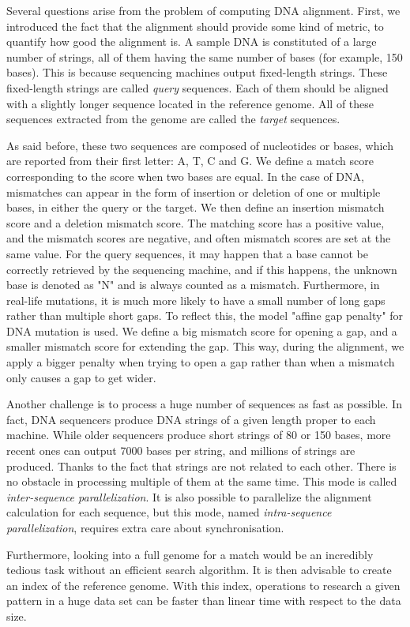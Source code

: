 Several questions arise from the problem of computing DNA alignment. First, we introduced the fact that the alignment should provide some kind of metric, to quantify how good the alignment is. A sample DNA is constituted of a large number of strings, all of them having the same number of bases (for example, 150 bases). This is because sequencing machines output fixed-length strings. These fixed-length strings are called \emph{query} sequences. Each of them should be aligned with a slightly longer sequence located in the reference genome. All of these sequences extracted from the genome are called the \emph{target} sequences.

As said before, these two sequences are composed of nucleotides or bases, which are reported from their first letter: A, T, C and G. We define a match score corresponding to the score when two bases are equal. In the case of DNA, mismatches can appear in the form of insertion or deletion of one or multiple bases, in either the query or the target. We then define an insertion mismatch score and a deletion mismatch score. The matching score has a positive value, and the mismatch scores are negative, and often mismatch scores are set at the same value. For the query sequences, it may happen that a base cannot be correctly retrieved by the sequencing machine, and if this happens, the unknown base is denoted as "N" and is always counted as a mismatch. Furthermore, in real-life mutations, it is much more likely to have a small number of long gaps rather than multiple short gaps. To reflect this, the model "affine gap penalty" for DNA mutation is used. We define a big mismatch score for opening a gap, and a smaller mismatch score for extending the gap. This way, during the alignment, we apply a bigger penalty when trying to open a gap rather than when a mismatch only causes a gap to get wider. 

Another challenge is to process a huge number of sequences as fast as possible. In fact, DNA sequencers produce DNA strings of a given length proper to each machine. While older sequencers produce short strings of 80 or 150 bases, more recent ones can output 7000 bases per string, and millions of strings are produced. Thanks to the fact that strings are not related to each other. There is no obstacle in processing multiple of them at the same time. This mode is called \emph{inter-sequence parallelization}. It is also possible to parallelize the alignment calculation for each sequence, but this mode, named \emph{intra-sequence parallelization}, requires extra care about synchronisation.

Furthermore, looking into a full genome for a match would be an incredibly tedious task without an efficient search algorithm. It is then advisable to create an index of the reference genome. With this index, operations to research a given pattern in a huge data set can be faster than linear time with respect to the data size.

